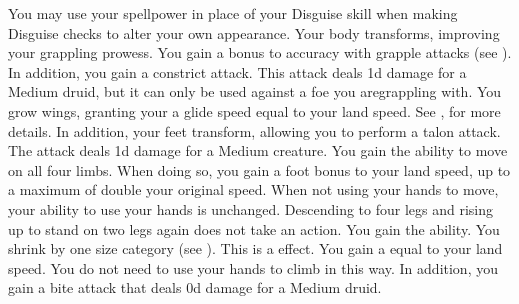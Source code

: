         You may use your spellpower in place of your Disguise skill when making Disguise checks to alter your own appearance.
        Your body transforms, improving your grappling prowess.
        You gain a  bonus to accuracy with grapple attacks (see ).
        In addition, you gain a constrict attack.
        This attack deals \plus1d damage for a Medium druid, but it can only be used against a foe you aregrappling with.
        You grow wings, granting your a glide speed equal to your land speed.
        See , for more details.
        In addition, your feet transform, allowing you to perform a talon attack.
        The attack deals \minus1d damage for a Medium creature.
        You gain the ability to move on all four limbs.
        When doing so, you gain a  foot bonus to your land speed, up to a maximum of double your original speed.
        When not using your hands to move, your ability to use your hands is unchanged.
        Descending to four legs and rising up to stand on two legs again does not take an action.
        You gain the  ability.
        You shrink by one size category (see ).
        This is a  effect.
        You gain a  equal to your land speed.
        You do not need to use your hands to climb in this way.
        In addition, you gain a bite attack that deals \plus0d damage for a Medium druid.


